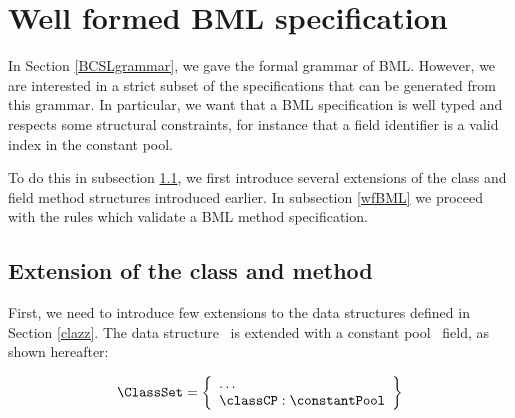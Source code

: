 
\newcommand{\getType}{\mbox{\rm\textsf{getType}}}
\newcommand{\constType}{\mbox{\rm\textsf{constType}}}
\newcommand{\getClass}{\mbox{\rm\textsf{getClass}}}
\newcommand{\application}{\mbox{\rm\textbf{CLS}}}
 
\section{Well formed BML specification}
In Section \ref{BCSLgrammar}, we gave the formal grammar of BML.
However, we are interested in a strict subset of 
the specifications that can be generated from this grammar. In particular, we want that a
BML specification is well typed and respects some structural constraints, for instance that a
 field identifier is a valid index in the constant pool. 

To do this  in subsection \ref{wpNotion},  we first introduce several extensions of the class and field method structures introduced earlier.   
In subsection \ref{wfBML} we proceed with  the rules which validate a BML method specification. 

\subsection{Extension of the class and method }\label{wpNotion}
First, we need to introduce few extensions to the data structures defined in Section \ref{clazz}.
The data structure \ClassSet \ is extended  with
a constant pool \constantPool \ field, as shown hereafter:  %

 
 $$ \begin{array}{l}
         \ClassSet = \left\{\begin{array}{l}\ldots \\ 
					  \classCP  : \constantPool
					  
                    \end{array} \right\}
   \end{array}
$$

